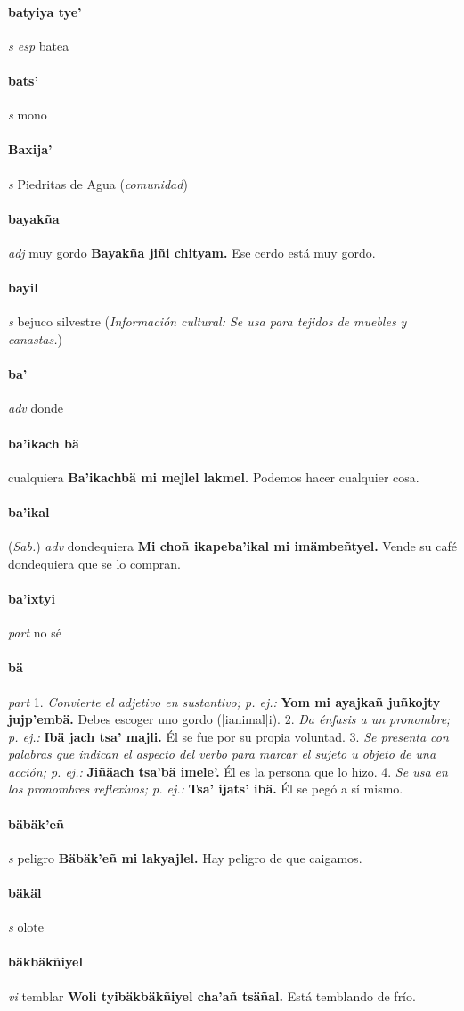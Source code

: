\documentclass{scrbook}
\newcommand{\entry}[1]{\paragraph{#1}}
\newcommand{\onedefinition}[1]{#1.}
\newcommand{\nontranslationdef}[1]{\textit{#1}}
\newcommand{\partofspeech}[1]{\textit{#1}}
\newcommand{\spanishtranslation}[1]{#1}
\newcommand{\clarification}[1]{(\textit{#1})}
\newcommand{\cholexample}[1]{\textbf{#1}}
\newcommand{\exampletranslation}[1]{#1}
\newcommand{\relevantdialect}[1]{(\textit{#1})}
\newcommand{\culturalinformation}[1]{(\textit{#1})}
\begin{document}
\begin{multicols}{2}
\entry{batyiya tye'}
\partofspeech{s esp}
\spanishtranslation{batea}

\entry{bats'}
\partofspeech{s}
\spanishtranslation{mono}

\entry{Baxija'}
\partofspeech{s}
\spanishtranslation{Piedritas de Agua}
\clarification{comunidad}

\entry{bayakña}
\partofspeech{adj}
\spanishtranslation{muy gordo}
\cholexample{Bayakña jiñi chityam.}
\exampletranslation{Ese cerdo está muy gordo.}

\entry{bayil}
\partofspeech{s}
\spanishtranslation{bejuco silvestre}
\culturalinformation{Información cultural: Se usa para tejidos de muebles y canastas.}

\entry{ba'}
\partofspeech{adv}
\spanishtranslation{donde}

\entry{ba'ikach bä}
\spanishtranslation{cualquiera}
\cholexample{Ba'ikachbä mi mejlel lakmel.}
\exampletranslation{Podemos hacer cualquier cosa.}

\entry{ba'ikal}
\relevantdialect{Sab.}
\partofspeech{adv}
\spanishtranslation{dondequiera}
\cholexample{Mi choñ ikapeba'ikal mi imämbeñtyel.}
\exampletranslation{Vende su café dondequiera que se lo compran.}

\entry{ba'ixtyi}
\partofspeech{part}
\spanishtranslation{no sé}

\entry{bä}
\partofspeech{part}
\onedefinition{1}
\nontranslationdef{Convierte el adjetivo en sustantivo; p. ej.:}
\cholexample{Yom mi ayajkañ juñkojty jujp'embä.}
\exampletranslation{Debes escoger uno gordo (|ianimal|i).}
\onedefinition{2}
\nontranslationdef{Da énfasis a un pronombre; p. ej.:}
\cholexample{Ibä jach tsa' majli.}
\exampletranslation{Él se fue por su propia voluntad.}
\onedefinition{3}
\nontranslationdef{Se presenta con palabras que indican el aspecto del verbo para marcar el sujeto u objeto de una acción; p. ej.:}
\cholexample{Jiñäach tsa'bä imele'.}
\exampletranslation{Él es la persona que lo hizo.}
\onedefinition{4}
\nontranslationdef{Se usa en los pronombres reflexivos; p. ej.:}
\cholexample{Tsa' ijats' ibä.}
\exampletranslation{Él se pegó a sí mismo.}

\entry{bäbäk'eñ}
\partofspeech{s}
\spanishtranslation{peligro}
\cholexample{Bäbäk'eñ mi lakyajlel.}
\exampletranslation{Hay peligro de que caigamos.}

\entry{bäkäl}
\partofspeech{s}
\spanishtranslation{olote}

\entry{bäkbäkñiyel}
\partofspeech{vi}
\spanishtranslation{temblar}
\cholexample{Woli tyibäkbäkñiyel cha'añ tsäñal.}
\exampletranslation{Está temblando de frío.}


\end{multicols}
\end{document}
